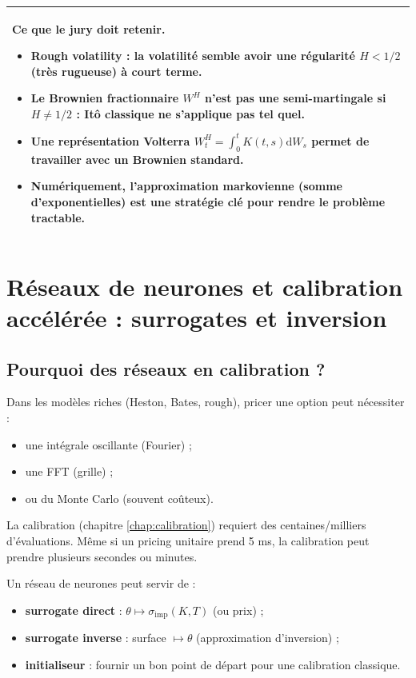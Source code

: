 \documentclass[11pt,a4paper]{report}
\newcommand{\dd}{\mathrm{d}}
\newcommand{\1}{\mathbbm{1}}
\theoremstyle{definition}
\theoremstyle{plain}
\theoremstyle{remark}
\newenvironment{jurybox}{%
  \begin{center}
  \setlength{\tabcolsep}{6pt}%
  \renewcommand{\arraystretch}{1.1}%
  \begin{tabular}{|p{0.94\textwidth}|}
  \hline
  \small\textbf{Ce que le jury doit retenir.}\par\medskip
}{%
  \\ \hline
  \end{tabular}
  \end{center}
}
\begin{document}
\begin{jurybox}
\begin{itemize}
\item Rough volatility : la volatilité semble avoir une régularité $H<1/2$ (très rugueuse) à court terme.
\item Le Brownien fractionnaire $W^H$ n'est pas une semi-martingale si $H\neq 1/2$ : Itô classique ne s'applique pas tel quel.
\item Une représentation Volterra $W_t^H=\int_0^t K(t,s)\dd W_s$ permet de travailler avec un Brownien standard.
\item Numériquement, l'approximation markovienne (somme d'exponentielles) est une stratégie clé pour rendre le problème tractable.
\end{itemize}
\end{jurybox}

\chapter{Réseaux de neurones et calibration accélérée : surrogates et inversion}
\label{chap:nn_calibration}

\section{Pourquoi des réseaux en calibration ?}
Dans les modèles riches (Heston, Bates, rough), pricer une option peut nécessiter :
\begin{itemize}
  \item une intégrale oscillante (Fourier) ;
  \item une FFT (grille) ;
  \item ou du Monte Carlo (souvent coûteux).
\end{itemize}
La calibration (chapitre \cref{chap:calibration}) requiert des centaines/milliers d'évaluations.
Même si un pricing unitaire prend 5 ms, la calibration peut prendre plusieurs secondes ou minutes.

Un réseau de neurones peut servir de :
\begin{itemize}
  \item \textbf{surrogate direct} : $\theta \mapsto \sigma_{\mathrm{imp}}(K,T)$ (ou prix) ;
  \item \textbf{surrogate inverse} : surface $\mapsto \theta$ (approximation d'inversion) ;
  \item \textbf{initialiseur} : fournir un bon point de départ pour une calibration classique.
\end{itemize}
\end{document}

